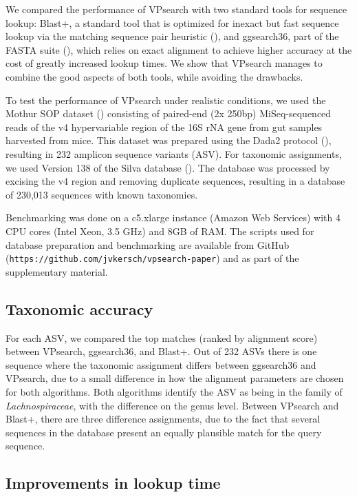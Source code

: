 \documentclass{bioinfo}
\begin{document}
We compared the performance of VPsearch with two standard tools for sequence
lookup: Blast+, a standard tool that is optimized for inexact but fast sequence
lookup via the matching sequence pair heuristic
(\cite{1990-altschul-BasicLocalAlignment}), and ggsearch36, part of the FASTA
suite (\cite{2016-pearson-FindingProteinNucleotide}), which relies on exact
alignment to achieve higher accuracy at the cost of greatly increased lookup
times. We show that VPsearch manages to combine the good aspects of both tools,
while avoiding the drawbacks.

To test the performance of VPsearch under realistic conditions, we used the
Mothur SOP dataset (\cite{2013-kozich-DevelopmentDualIndexSequencing})
consisting of paired-end (2x 250bp) MiSeq-sequenced reads of the v4
hypervariable region of the 16S rNA gene from gut samples harvested from mice.
This dataset was prepared using the Dada2 protocol
(\cite{2016-callahan-DADA2HighresolutionSample}), resulting in 232 amplicon
sequence variants (ASV). For taxonomic assignments, we used Version 138 of the
Silva database (\cite{2013-quast-SILVARibosomalRNA}). The database was
processed by excising the v4 region and removing duplicate sequences, resulting
in a database of 230,013 sequences with known taxonomies.

Benchmarking was done on a c5.xlarge instance (Amazon Web Services) with 4 CPU
cores (Intel Xeon, 3.5 GHz) and 8GB of RAM. The scripts used for database
preparation and benchmarking are available from GitHub
(\texttt{https://github.com/jvkersch/vpsearch-paper}) and as part of the
supplementary material.

\subsection{Taxonomic accuracy}

For each ASV, we compared the top matches (ranked by alignment score) between
VPsearch, ggsearch36, and Blast+. Out of 232 ASVs there is one sequence where
the taxonomic assignment differs between ggsearch36 and VPsearch, due to a
small difference in how the alignment parameters are chosen for both
algorithms. Both algorithms identify the ASV as being in the family of
\emph{Lachnospiraceae}, with the difference on the genus level. Between
VPsearch and Blast+, there are three difference assignments, due to the fact
that several sequences in the database present an equally plausible match for
the query sequence.

\subsection{Improvements in lookup time}
\end{document}
